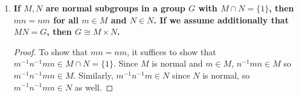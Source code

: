 \documentclass[12pt, a4paper]{article}
\theoremstyle{nonumberplain}
\newtheorem{proof}{Proof}
\begin{document}
\begin{enumerate}
\begin{proof}
            It remains to check that $\alpha$ is a homomorphism.
            Indeed,
            \begin{align*}
                \alpha(\ker(\phi)h_1\ker(\phi)h_2) &= \alpha(\ker(\phi)(h_1h_2)\\
                                                   &= \phi(h_1h_2)\\
                                                   &= \phi(h_1)\phi(h_2)\\
                                                   &= \alpha(\ker(\phi)h_1)\alpha(\ker(\phi)h_2)
            \end{align*}
            as required.
        \end{proof}
    \item \textbf{If $M,N$ are normal subgroups in a group $G$ with $M\cap N=\{1\}$, then $mn=nm$ for all $m\in M$ and $N\in N$.
            If we assume additionally that $MN=G$, then $G\cong M\times N$.
        }
        \begin{proof}
            To show that $mn=nm$, it suffices to show that $m^{-1}n^{-1}mn\in M\cap N=\{1\}$.
            Since $M$ is normal and $m\in M$, $n^{-1}mn\in M$ so $m^{-1}n^{-1}mn\in M$.
            Similarly, $m^{-1}n^{-1}m\in N$ since $N$ is normal, so $m^{-1}n^{-1}mn\in N$ as well.


\end{proof}
\end{enumerate}
\end{document}
